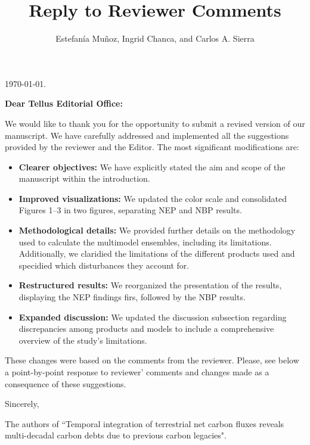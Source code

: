 \documentclass[authoryear,11pt,a4paper]{article}
\title{Reply to Reviewer Comments}
\author{Estefanía Muñoz, Ingrid Chanca, and Carlos A. Sierra}
\begin{document}
\today.
\vspace{40pt}

\textbf{Dear Tellus Editorial Office:}
\vspace{15pt}

 
We would like to thank you for the opportunity to submit a revised version of our manuscript. We have carefully addressed and implemented all the suggestions provided by the reviewer and the Editor. The most significant modifications are:

\begin{itemize}
\item [-] \textbf{Clearer objectives:} We have explicitly stated the aim and scope of the manuscript within the introduction.
\item [-] \textbf{Improved visualizations:} We updated the color scale and consolidated Figures 1--3 in two figures, separating NEP and NBP results.
\item [-] \textbf{Methodological details:} We provided further details on the methodology used to calculate the multimodel ensembles, including its limitations. Additionally, we claridied the limitations of the different products used and specidied which disturbances they account for.
\item [-] \textbf{Restructured results:} We reorganized the presentation of the results, displaying the NEP findings firs, followed by the NBP results. 
\item [-] \textbf{Expanded discussion:} We updated the discussion subsection regarding discrepancies among products and models to include a comprehensive overview of the study's limitations.
\end{itemize}

These changes were based on the comments from the reviewer. Please, see below a point-by-point response to reviewer' comments and changes made as a consequence of these suggestions.

\vspace{30pt}
Sincerely,

\vspace{20pt}
The authors of ``Temporal integration of terrestrial net carbon fluxes reveals multi-decadal carbon debts due to previous carbon legacies".

\clearpage
\end{document}
